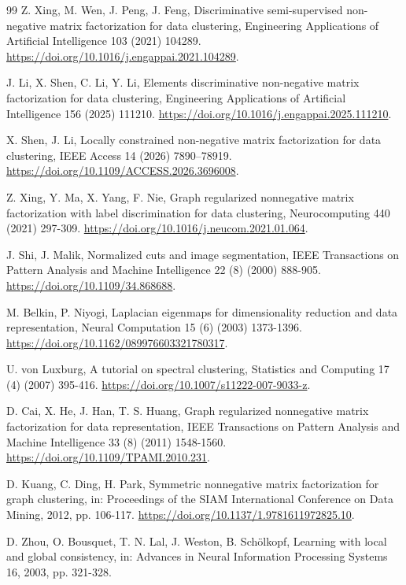 \documentclass[preprint,12pt]{elsarticle}
\theoremstyle{remark}
\begin{document}
\begin{thebibliography}{99}
Z. Xing, M. Wen, J. Peng, J. Feng, Discriminative semi-supervised non-negative matrix factorization for data clustering,
Engineering Applications of Artificial Intelligence 103 (2021) 104289.
\url{https://doi.org/10.1016/j.engappai.2021.104289}.

J. Li, X. Shen, C. Li, Y. Li, Elements discriminative non-negative matrix factorization for data clustering,
Engineering Applications of Artificial Intelligence 156 (2025) 111210.
\url{https://doi.org/10.1016/j.engappai.2025.111210}.

X. Shen, J. Li, Locally constrained non-negative matrix factorization for data clustering,
IEEE Access 14 (2026) 7890--78919. \url{https://doi.org/10.1109/ACCESS.2026.3696008}.

Z. Xing, Y. Ma, X. Yang, F. Nie, Graph regularized nonnegative matrix factorization with label discrimination for data clustering,
Neurocomputing 440 (2021) 297-309. \url{https://doi.org/10.1016/j.neucom.2021.01.064}.

J. Shi, J. Malik, Normalized cuts and image segmentation,
IEEE Transactions on Pattern Analysis and Machine Intelligence 22 (8) (2000) 888-905.
\url{https://doi.org/10.1109/34.868688}.

M. Belkin, P. Niyogi, Laplacian eigenmaps for dimensionality reduction and data representation,
Neural Computation 15 (6) (2003) 1373-1396. \url{https://doi.org/10.1162/089976603321780317}.

U. von Luxburg, A tutorial on spectral clustering,
Statistics and Computing 17 (4) (2007) 395-416. \url{https://doi.org/10.1007/s11222-007-9033-z}.

D. Cai, X. He, J. Han, T. S. Huang, Graph regularized nonnegative matrix factorization for data representation,
IEEE Transactions on Pattern Analysis and Machine Intelligence 33 (8) (2011) 1548-1560.
\url{https://doi.org/10.1109/TPAMI.2010.231}.

D. Kuang, C. Ding, H. Park, Symmetric nonnegative matrix factorization for graph clustering,
in: Proceedings of the SIAM International Conference on Data Mining, 2012, pp. 106-117.
\url{https://doi.org/10.1137/1.9781611972825.10}.

D. Zhou, O. Bousquet, T. N. Lal, J. Weston, B. Sch\"olkopf,
Learning with local and global consistency,
in: Advances in Neural Information Processing Systems 16, 2003, pp. 321-328.


\end{thebibliography}
\end{document}
